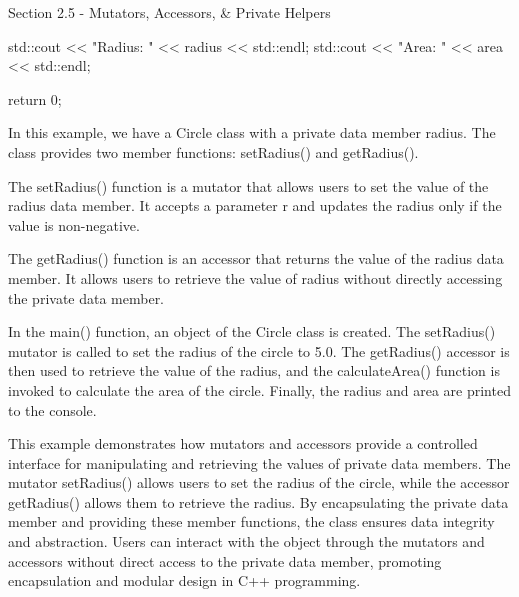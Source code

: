 \begin{notes}{Section 2.5 - Mutators, Accessors, \& Private Helpers}
\begin{highlight}
\begin{code}[C++]
{        std::cout << "Radius: " << radius << std::endl;
        std::cout << "Area: " << area << std::endl;
        
        return 0;
    }        
    \end{code}
        In this example, we have a Circle class with a private data member radius. The class provides two member functions: setRadius() and getRadius().
    
        The setRadius() function is a mutator that allows users to set the value of the radius data member. It accepts a parameter r and updates the radius only if the value is non-negative.
    
        The getRadius() function is an accessor that returns the value of the radius data member. It allows users to retrieve the value of radius without directly accessing the private data member.
    
        In the main() function, an object of the Circle class is created. The setRadius() mutator is called to set the radius of the circle to 5.0. The getRadius() accessor is then used to retrieve the value of the 
        radius, and the calculateArea() function is invoked to calculate the area of the circle. Finally, the radius and area are printed to the console.
    
        This example demonstrates how mutators and accessors provide a controlled interface for manipulating and retrieving the values of private data members. The mutator setRadius() allows users to set the radius 
        of the circle, while the accessor getRadius() allows them to retrieve the radius. By encapsulating the private data member and providing these member functions, the class ensures data integrity and abstraction. Users 
        can interact with the object through the mutators and accessors without direct access to the private data member, promoting encapsulation and modular design in C++ programming.
    \end{highlight}
\end{notes}

